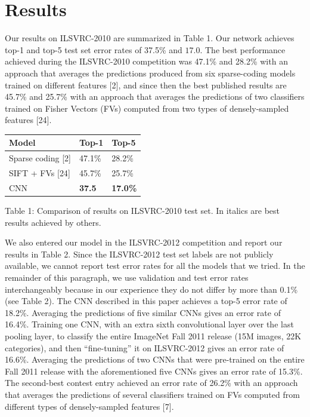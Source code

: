 \documentclass[12pt,a4paper,UTF8,twoside]{book}
\begin{document}
\hypertarget{results}{%
\section{Results}\label{results}}

Our results on ILSVRC-2010 are summarized in Table 1. Our network achieves top-1 and top-5 test set error rates of 37.5\% and \(17.0%
\). The best performance achieved during the ILSVRC-2010 competition was 47.1\% and 28.2\% with an approach that averages the predictions produced from six sparse-coding models trained on different features {[}2{]}, and since then the best published results are 45.7\% and 25.7\% with an approach that averages the predictions of two classifiers trained on Fisher Vectors (FVs) computed from two types of densely-sampled features {[}24{]}.

\begin{longtable}[]{@{}lll@{}}
\toprule
\textbf{Model} & \textbf{Top-1} & \textbf{Top-5}\tabularnewline
\midrule
\endhead
Sparse coding {[}2{]} & 47.1\% & 28.2\%\tabularnewline
SIFT + FVs {[}24{]} & 45.7\% & 25.7\%\tabularnewline
CNN & \textbf{37.5} & \textbf{17.0\%}\tabularnewline
\bottomrule
\end{longtable}

Table 1: Comparison of results on ILSVRC-2010 test set. In italics are best results achieved by others.

We also entered our model in the ILSVRC-2012 competition and report our results in Table 2. Since the ILSVRC-2012 test set labels are not publicly available, we cannot report test error rates for all the models that we tried. In the remainder of this paragraph, we use validation and test error rates interchangeably because in our experience they do not differ by more than 0.1\% (see Table 2). The CNN described in this paper achieves a top-5 error rate of 18.2\%. Averaging the predictions of five similar CNNs gives an error rate of 16.4\%. Training one CNN, with an extra sixth convolutional layer over the last pooling layer, to classify the entire ImageNet Fall 2011 release (15M images, 22K categories), and then ``fine-tuning'' it on ILSVRC-2012 gives an error rate of 16.6\%. Averaging the predictions of two CNNs that were pre-trained on the entire Fall 2011 release with the aforementioned five CNNs gives an error rate of 15.3\%. The second-best contest entry achieved an error rate of 26.2\% with an approach that averages the predictions of several classifiers trained on FVs computed from different types of densely-sampled features {[}7{]}.
\end{document}
